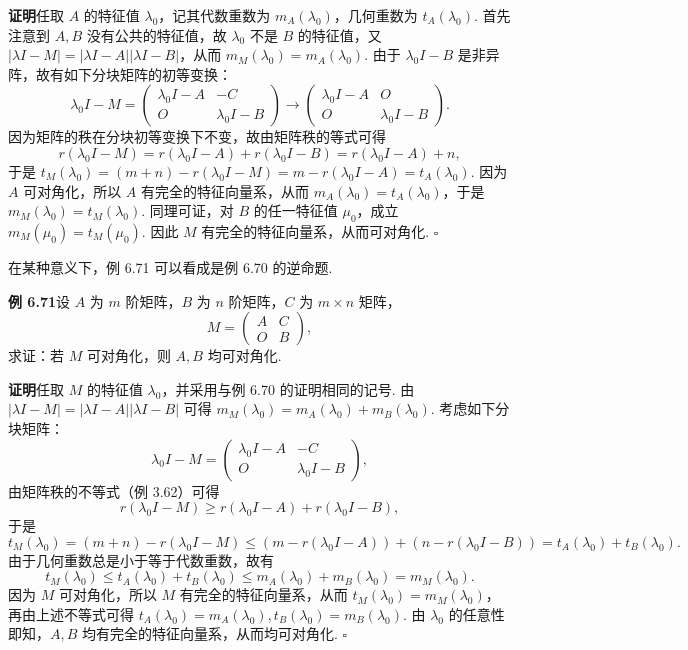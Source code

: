 \documentclass[UTF8, 12pt, fontset=fandol, oneside]{ctexart}
\begin{document}
\noindent\textbf{证明}\quad 任取 $A$ 的特征值 $\lambda_0$，记其代数重数为 $m_A(\lambda_0)$，几何重数为 $t_A(\lambda_0)$. 首先注意到 $A,B$ 没有公共的特征值，故 $\lambda_0$ 不是 $B$ 的特征值，又 $|\lambda I-M|=|\lambda I-A||\lambda I-B|$，从而 $m_M(\lambda_0)=m_A(\lambda_0)$. 由于 $\lambda_0I-B$ 是非异阵，故有如下分块矩阵的初等变换：
\[
\lambda_0I-M
=\left(\begin{array}{cc}
\lambda_0I-A & -C\\
O & \lambda_0I-B
\end{array}\right)
\longrightarrow
\left(\begin{array}{cc}
\lambda_0I-A & O\\
O & \lambda_0I-B
\end{array}\right).
\]
因为矩阵的秩在分块初等变换下不变，故由矩阵秩的等式可得
\[
r(\lambda_0I-M)=r(\lambda_0I-A)+r(\lambda_0I-B)=r(\lambda_0I-A)+n,
\]
于是 $t_M(\lambda_0)=(m+n)-r(\lambda_0I-M)=m-r(\lambda_0I-A)=t_A(\lambda_0)$. 因为 $A$ 可对角化，所以 $A$ 有完全的特征向量系，从而 $m_A(\lambda_0)=t_A(\lambda_0)$，于是 $m_M(\lambda_0)=t_M(\lambda_0)$. 同理可证，对 $B$ 的任一特征值 $\mu_0$，成立 $m_M(\mu_0)=t_M(\mu_0)$. 因此 $M$ 有完全的特征向量系，从而可对角化. $\square$

在某种意义下，例 6.71 可以看成是例 6.70 的逆命题.

\noindent\textbf{例 6.71}\quad 设 $A$ 为 $m$ 阶矩阵，$B$ 为 $n$ 阶矩阵，$C$ 为 $m\times n$ 矩阵，
\[
M=\left(\begin{array}{cc}
A & C\\
O & B
\end{array}\right),
\]
求证：若 $M$ 可对角化，则 $A,B$ 均可对角化.

\noindent\textbf{证明}\quad 任取 $M$ 的特征值 $\lambda_0$，并采用与例 6.70 的证明相同的记号. 由 $|\lambda I-M|=|\lambda I-A||\lambda I-B|$ 可得 $m_M(\lambda_0)=m_A(\lambda_0)+m_B(\lambda_0)$. 考虑如下分块矩阵：
\[
\lambda_0I-M=\left(\begin{array}{cc}
\lambda_0I-A & -C\\
O & \lambda_0I-B
\end{array}\right),
\]
由矩阵秩的不等式（例 3.62）可得
\[
r(\lambda_0I-M)\ge r(\lambda_0I-A)+r(\lambda_0I-B),
\]
于是
\[
t_M(\lambda_0)=(m+n)-r(\lambda_0I-M)
\le (m-r(\lambda_0I-A))+(n-r(\lambda_0I-B))
=t_A(\lambda_0)+t_B(\lambda_0).
\]
由于几何重数总是小于等于代数重数，故有
\[
t_M(\lambda_0)\le t_A(\lambda_0)+t_B(\lambda_0)\le m_A(\lambda_0)+m_B(\lambda_0)=m_M(\lambda_0).
\]
因为 $M$ 可对角化，所以 $M$ 有完全的特征向量系，从而 $t_M(\lambda_0)=m_M(\lambda_0)$，再由上述不等式可得 $t_A(\lambda_0)=m_A(\lambda_0),t_B(\lambda_0)=m_B(\lambda_0)$. 由 $\lambda_0$ 的任意性即知，$A,B$ 均有完全的特征向量系，从而均可对角化. $\square$
\end{document}
